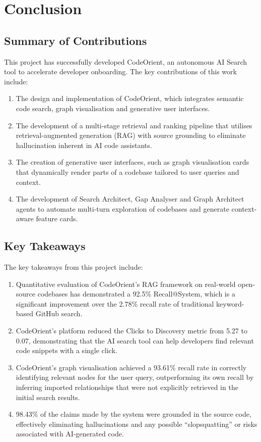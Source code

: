 \chapter{Conclusion}
\section{Summary of Contributions}
This project has successfully developed CodeOrient, an autonomous AI Search tool to accelerate developer onboarding. The key contributions of this work include:
\begin{enumerate}
    \item The design and implementation of CodeOrient, which integrates semantic code search, graph visualisation and generative user interfaces.
    \item The development of a multi-stage retrieval and ranking pipeline that utilises retrieval-augmented generation (RAG) with source grounding to eliminate hallucination inherent in AI code assistants.
    \item The creation of generative user interfaces, such as graph visualisation cards that dynamically render parts of a codebase tailored to user queries and context.
    \item The development of Search Architect, Gap Analyser and Graph Architect agents to automate multi-turn exploration of codebases and generate context-aware feature cards.
\end{enumerate}

\section{Key Takeaways}
The key takeaways from this project include:
\begin{enumerate}
    \item Quantitative evaluation of CodeOrient's RAG framework on real-world open-source codebases has demonstrated a 92.5\% Recall@System, which is a significant improvement over the 2.78\% recall rate of traditional keyword-based GitHub search.
    \item CodeOrient's platform reduced the Clicks to Discovery metric from 5.27 to 0.07, demonstrating that the AI search tool can help developers find relevant code snippets with a single click.
    \item CodeOrient’s graph visualisation achieved a 93.61\% recall rate in correctly identifying relevant nodes for the user query, outperforming its own recall by inferring imported relationships that were not explicitly retrieved in the initial search results.
    \item 98.43\% of the claims made by the system were grounded in the source code, effectively eliminating hallucinations and any possible ``slopsquatting'' or risks associated with AI-generated code.
\end{enumerate}

